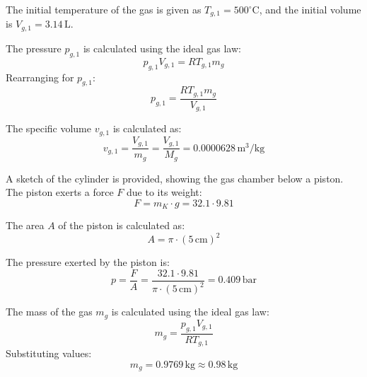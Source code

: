 The initial temperature of the gas is given as \( T_{g,1} = 500^\circ\text{C} \), and the initial volume is \( V_{g,1} = 3.14 \, \text{L} \).  

The pressure \( p_{g,1} \) is calculated using the ideal gas law:  
\[
p_{g,1} V_{g,1} = R T_{g,1} m_g
\]  
Rearranging for \( p_{g,1} \):  
\[
p_{g,1} = \frac{R T_{g,1} m_g}{V_{g,1}}
\]  

The specific volume \( v_{g,1} \) is calculated as:  
\[
v_{g,1} = \frac{V_{g,1}}{m_g} = \frac{V_{g,1}}{M_g} = 0.0000628 \, \text{m}^3/\text{kg}
\]  

A sketch of the cylinder is provided, showing the gas chamber below a piston. The piston exerts a force \( F \) due to its weight:  
\[
F = m_K \cdot g = 32.1 \cdot 9.81
\]  

The area \( A \) of the piston is calculated as:  
\[
A = \pi \cdot (5 \, \text{cm})^2
\]  

The pressure exerted by the piston is:  
\[
p = \frac{F}{A} = \frac{32.1 \cdot 9.81}{\pi \cdot (5 \, \text{cm})^2} = 0.409 \, \text{bar}
\]  

The mass of the gas \( m_g \) is calculated using the ideal gas law:  
\[
m_g = \frac{p_{g,1} V_{g,1}}{R T_{g,1}}
\]  
Substituting values:  
\[
m_g = 0.9769 \, \text{kg} \approx 0.98 \, \text{kg}
\]